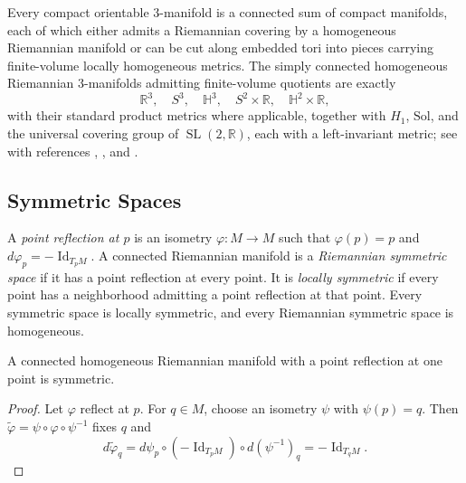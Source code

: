 Every compact orientable $3$-manifold is a connected sum of compact manifolds,
each of which either admits a Riemannian covering by a homogeneous Riemannian
manifold or can be cut along embedded tori into pieces carrying finite-volume
locally homogeneous metrics. The simply connected homogeneous Riemannian
$3$-manifolds admitting finite-volume quotients are exactly
\[
\mathbb R^3,\quad S^3,\quad\mathbb H^3,\quad
S^2\times\mathbb R,\quad\mathbb H^2\times\mathbb R,
\]
with their standard product metrics where applicable, together with $H_1$,
$\mathrm{Sol}$, and the universal covering group of
$\operatorname{SL}(2,\mathbb R)$, each with a left-invariant metric; see
with references \cite{Thu97}, \cite{Sco83}, and
\cite[KL08,MF10,MT14]{BBBMP}.

\subsection{Symmetric Spaces}

A \emph{point reflection at $p$} is an isometry $\varphi\colon M\to M$ such
that $\varphi(p)=p$ and $d\varphi_p=-\operatorname{Id}_{T_pM}$. A connected
Riemannian manifold is a \emph{Riemannian symmetric space} if it has a point
reflection at every point. It is \emph{locally symmetric} if every point has a
neighborhood admitting a point reflection at that point. Every symmetric space
is locally symmetric, and every Riemannian symmetric space is homogeneous.

\begin{lemma}
\label{lem:homogeneous-point-reflection-symmetric}
A connected homogeneous Riemannian manifold with a point reflection at one
point is symmetric.
\end{lemma}
\begin{proof}
\sketch Let $\varphi$ reflect at $p$. For $q\in M$, choose an isometry $\psi$
with $\psi(p)=q$. Then $\widetilde\varphi=\psi\circ\varphi\circ\psi^{-1}$ fixes
$q$ and
\[
d\widetilde\varphi_q
=d\psi_p\circ(-\operatorname{Id}_{T_pM})\circ d(\psi^{-1})_q
=-\operatorname{Id}_{T_qM}.
\]
\end{proof}

